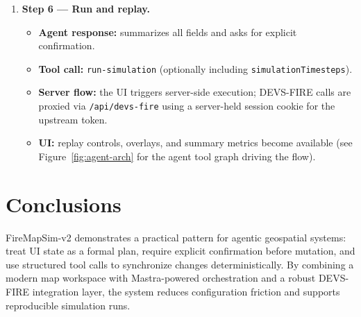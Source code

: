 \documentclass[12pt]{article}
\begin{document}
\begin{enumerate}
  \item \textbf{Step 6 --- Run and replay.}
  \begin{itemize}
    \item \textbf{Agent response:} summarizes all fields and asks for explicit confirmation.
    \item \textbf{Tool call:} \texttt{run-simulation} (optionally including \texttt{simulationTimesteps}).
    \item \textbf{Server flow:} the UI triggers server-side execution; DEVS-FIRE calls are proxied via
          \texttt{/api/devs-fire} using a server-held session cookie for the upstream token.
    \item \textbf{UI:} replay controls, overlays, and summary metrics become available
          (see Figure~\ref{fig:agent-arch} for the agent tool graph driving the flow).
  \end{itemize}
\end{enumerate}

\section{Conclusions}
FireMapSim-v2 demonstrates a practical pattern for agentic geospatial systems: treat UI state as a
formal plan, require explicit confirmation before mutation, and use structured tool calls to
synchronize changes deterministically. By combining a modern map workspace with Mastra-powered
orchestration and a robust DEVS-FIRE integration layer, the system reduces configuration friction
and supports reproducible simulation runs.
\end{document}
